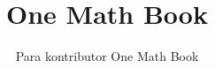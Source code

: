 \documentclass[11pt,a4paper,twoside,openany]{book}
\title{One Math Book}
\author{Para kontributor One Math Book}
\date{\bookdate}
\begin{document}
\frontmatter



\tableofcontents

\mainmatter



\appendix
\part{\omsolutionspart}


\backmatter
\printindex
\end{document}
